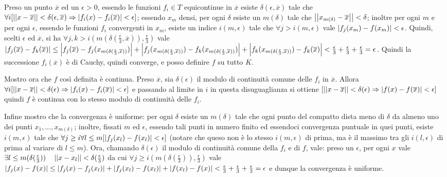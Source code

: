 Preso un punto $\overline x$ ed un $\epsilon>0$, essendo le funzioni $f_i\in T$ equicontinue in $\overline x$ esiste $\delta(\epsilon,\overline x)$ tale che $\forall i[\left|\left|x-\overline x\right|\right|<\delta(\epsilon,\overline x)\Rightarrow\left|f_i(x)-f_i(\overline x)\right|<\epsilon]$; essendo $x_m$ densi, per ogni $\delta$ esiste un $m(\delta)$ tale che $\left|\left|x_{m(\delta)}-\overline x\right|\right|<\delta$; inoltre per ogni $m$ e per ogni $\epsilon$, essendo le funzioni $f_i$ convergenti in $x_m$, esiste un indice $i(m,\epsilon)$ tale che $\forall j>i(m,\epsilon)$ vale $\left|f_j(x_m)-f(x_m)\right|<\epsilon$. Quindi, scelti $\epsilon$ ed $\overline x$, si ha $\forall j,k>i(m(\delta(\frac{\epsilon}{3},\overline x)),\frac{\epsilon}{3})$ vale $\left|f_j(\overline x)-f_k(\overline x)\right|\le\left|f_j(\overline x)-f_j(x_{m(\delta(\frac{\epsilon}{3},\overline x))})\right|+\left|f_j(x_{m(\delta(\frac{\epsilon}{3},\overline x))})-f_k(x_{m(\delta(\frac{\epsilon}{3},\overline x))})\right|+\left|f_k(x_{m(\delta(\frac{\epsilon}{3},\overline x))})-f_k(\overline x)\right|<\frac{\epsilon}{3}+\frac{\epsilon}{3}+\frac{\epsilon}{3}=\epsilon$. Quindi la successione $f_i(\overline x)$ è di Cauchy, quindi converge, e posso definire $f$ su tutto $K$.

Mostro ora che $f$ così definita è continua. Preso $\overline x$, sia $\delta(\epsilon)$ il modulo di continuità comune delle $f_i$ in $\overline x$. Allora $\forall i[\left|\left|x-\overline x\right|\right|<\delta(\epsilon)\Rightarrow\left|f_i(x)-f_i(\overline x)\right|<\epsilon]$ e passando al limite in $i$ in questa disuguaglianza si ottiene $[\left|\left|x-\overline x\right|\right|<\delta(\epsilon)\Rightarrow\left|f(x)-f(\overline x)\right|<\epsilon]$ quindi $f$ è continua con lo stesso modulo di continuità delle $f_i$.

Infine mostro che la convergenza è uniforme: per ogni $\delta$ esiste un $m(\delta)$ tale che ogni punto del compatto dista meno di $\delta$ da almeno uno dei punti $x_1,...,x_{m(\delta)}$; inoltre, fissati $m$ ed $\epsilon$, essendo tali punti in numero finito ed essendoci convergenza puntuale in quei punti, esiste $i(m,\epsilon)$ tale che $\forall j\ge i\forall l\le m[\left|f_j(x_l)-f(x_l)\right|<\epsilon]$ (notare che queso non è lo stesso $i(m,\epsilon)$ di prima, ma è il massimo tra gli $i(l,\epsilon)$ di prima al variare di $l\le m$). Ora, chamando $\delta(\epsilon)$ il modulo di continuità comune della $f_i$ e di $f$, vale: preso un $\epsilon$, per ogni $x$ vale $\exists l\le m(\delta(\frac{\epsilon}{3}))\quad\left|\left|x-x_l\right|\right|<\delta(\frac{\epsilon}{3})$ da cui $\forall j\ge i(m(\delta(\frac{\epsilon}{3})),\frac{\epsilon}{3})$ vale $\left|f_j(x)-f(x)\right|\le\left|f_j(x)-f_j(x_l)\right|+\left|f_j(x_l)-f(x_l)\right|+\left|f(x_l)-f(x)\right|<\frac{\epsilon}{3}+\frac{\epsilon}{3}+\frac{\epsilon}{3}=\epsilon$ e dunque la convergenza è uniforme.



